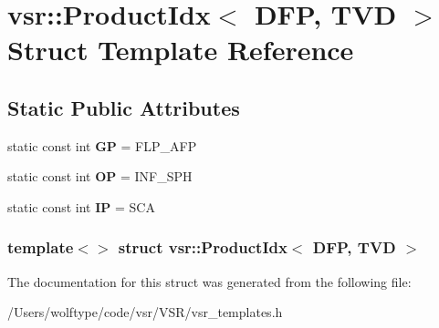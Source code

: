 \hypertarget{structvsr_1_1_product_idx_3_01_d_f_p_00_01_t_v_d_01_4}{\section{vsr\-:\-:Product\-Idx$<$ D\-F\-P, T\-V\-D $>$ Struct Template Reference}
\label{structvsr_1_1_product_idx_3_01_d_f_p_00_01_t_v_d_01_4}
}
\subsection*{Static Public Attributes}
\begin{DoxyCompactItemize}
\item 
\hypertarget{structvsr_1_1_product_idx_3_01_d_f_p_00_01_t_v_d_01_4_a5b0929ed9dcc6215849c8006f7711f4a}{static const int {\bfseries G\-P} = F\-L\-P\-\_\-\-A\-F\-P}\label{structvsr_1_1_product_idx_3_01_d_f_p_00_01_t_v_d_01_4_a5b0929ed9dcc6215849c8006f7711f4a}

\item 
\hypertarget{structvsr_1_1_product_idx_3_01_d_f_p_00_01_t_v_d_01_4_a28bd35f48904c69ded297326a4ed0b73}{static const int {\bfseries O\-P} = I\-N\-F\-\_\-\-S\-P\-H}\label{structvsr_1_1_product_idx_3_01_d_f_p_00_01_t_v_d_01_4_a28bd35f48904c69ded297326a4ed0b73}

\item 
\hypertarget{structvsr_1_1_product_idx_3_01_d_f_p_00_01_t_v_d_01_4_a41e127783bcb9c7fa28448030342c8eb}{static const int {\bfseries I\-P} = S\-C\-A}\label{structvsr_1_1_product_idx_3_01_d_f_p_00_01_t_v_d_01_4_a41e127783bcb9c7fa28448030342c8eb}

\end{DoxyCompactItemize}
\subsubsection*{template$<$$>$ struct vsr\-::\-Product\-Idx$<$ D\-F\-P, T\-V\-D $>$}



The documentation for this struct was generated from the following file\-:\begin{DoxyCompactItemize}
\item 
/\-Users/wolftype/code/vsr/\-V\-S\-R/vsr\-\_\-templates.\-h\end{DoxyCompactItemize}
